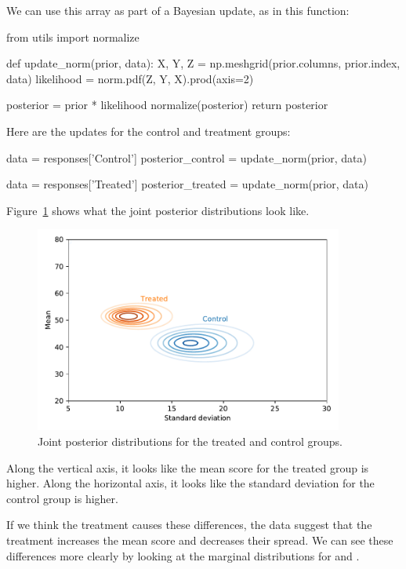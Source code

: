 \documentclass[12pt]{book}
\theoremstyle{exercise}
\begin{document}
We can use this array as part of a Bayesian update, as in this function:

\begin{code}
from utils import normalize

def update_norm(prior, data):
    X, Y, Z = np.meshgrid(prior.columns, prior.index, data)
    likelihood = norm.pdf(Z, Y, X).prod(axis=2)

    posterior = prior * likelihood
    normalize(posterior)
    return posterior
\end{code}

Here are the updates for the control and treatment groups:

\begin{code}
data = responses['Control']
posterior_control = update_norm(prior, data)

data = responses['Treated']
posterior_treated = update_norm(prior, data)
\end{code}

Figure~\ref{fig11-02} shows what the joint posterior distributions look like.

\begin{figure}
\centerline{\includegraphics[width=4in]{figs/fig11-02.pdf}}
\caption{Joint posterior distributions for the treated and control groups.}
\label{fig11-02}
\end{figure}

Along the vertical axis, it looks like the mean score for the treated
group is higher. Along the horizontal axis, it looks like the standard
deviation for the control group is higher.

If we think the treatment causes these differences, the data suggest
that the treatment increases the mean score and decreases their spread.
We can see these differences more clearly by looking at the marginal
distributions for  and
.
\end{document}
